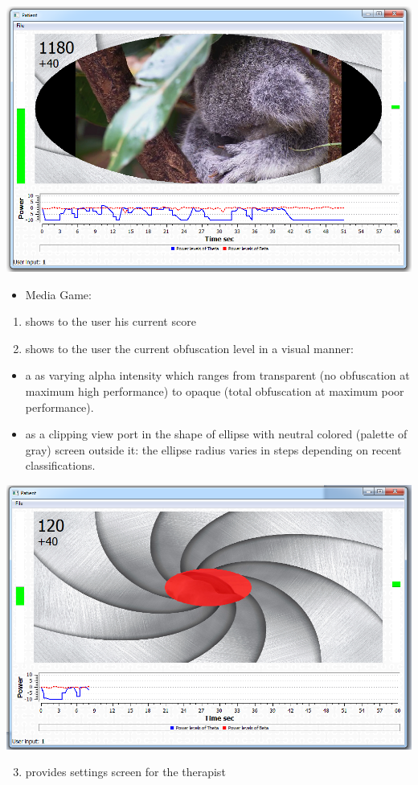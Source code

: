 \documentclass[letterpaper,10pt,english]{sphinxmanual}
\begin{document}
{\hfill\includegraphics{MediaGame.PNG}\hfill}
\begin{itemize}
\item {} 
Media Game:

\end{itemize}
\begin{enumerate}
\item {} 
shows to the user his current score

\item {} 
shows to the user the current obfuscation level in a visual manner:

\end{enumerate}
\begin{itemize}
\item {} 
a as varying alpha intensity which ranges from transparent (no obfuscation at maximum high performance) to opaque (total obfuscation at maximum poor performance).

\item {} 
as a clipping view port in the shape of ellipse with neutral colored (palette of gray) screen outside it: the ellipse radius varies in steps depending on recent classifications.

\end{itemize}

{\hfill\includegraphics{MediaGameObfuscationAndAlpha.PNG}\hfill}
\begin{enumerate}
\setcounter{enumi}{2}
\item {} 
provides settings screen for the therapist

\end{enumerate}
\end{document}
